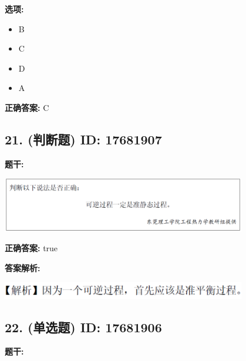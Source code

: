\documentclass[12pt]{article}
\begin{document}
\textbf{选项:}
\begin{itemize}[leftmargin=*]
  \item B

  \item C

  \item D

  \item A

\end{itemize}

\textbf{正确答案:}
C

\vspace{0.5em}\hrulefill\vspace{1em}

\subsection*{21. (判断题) \small ID: 17681907}

\textbf{题干:}


\begin{center}\includegraphics[width=0.8\textwidth, height=0.25\textheight, keepaspectratio]{question_21_17681907/title_img_1.png}\end{center}

\textbf{正确答案:}
true

\textbf{答案解析:}


\begin{center}\includegraphics[width=0.8\textwidth, height=0.25\textheight, keepaspectratio]{question_21_17681907/correct_replay_img_1.png}\end{center}

\vspace{0.5em}\hrulefill\vspace{1em}

\subsection*{22. (单选题) \small ID: 17681906}

\textbf{题干:}
\end{document}
